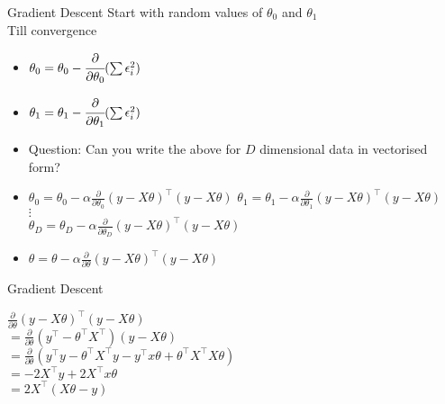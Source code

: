 \documentclass{beamer}
\begin{document}
\begin{frame}{Gradient Descent}
Start with random values of $\theta_{0}$ and $\theta_{1}$\\
Till convergence
\begin{itemize}[<+->]
	\item $\theta_{0} = \theta_{0} - \cfrac{\partial}{\partial \theta_{0}} (\sum \epsilon_{i}^{2}) $
	\item $\theta_{1} = \theta_{1} - \cfrac{\partial}{\partial \theta_{1}} (\sum \epsilon_{i}^{2}) $
	\item Question: Can you write the above for $D$ dimensional data in vectorised form?
	\item	\(\theta_{0}=\theta_{0}-\alpha \frac{\partial}{\partial \theta_{0}}\left(y-X\theta\right)^{\top}\left(y-X\theta\right)\)
	\(\theta_{1}=\theta_{1}-\alpha \frac{\partial}{\partial \theta_{1}}\left(y-X\theta\right)^{\top}\left(y-X\theta\right)\) 
	\\ $\vdots$
	\\	\(\theta_{D}=\theta_{D}-\alpha \frac{\partial}{\partial \theta_{D}}\left(y-X\theta\right)^{\top}\left(y-X\theta\right)\)
	\item \(\theta=\theta - \alpha \frac{\partial}{\partial \theta}\left(y-X\theta\right)^{\top}\left(y-X\theta\right)\) 

\end{itemize}
\end{frame}

\begin{frame}{Gradient Descent}


\(\frac{\partial}{\partial \theta}(y-X \theta)^{\top}(y-X \theta)\)
\\ \(=\frac{\partial}{\partial \theta}\left(y^{\top}-\theta^{\top} X^{\top}\right)(y-X \theta)\)
\\ \(=\frac{\partial}{\partial \theta}\left(y^{\top} y-\theta^{\top} X^{\top} y-y^{\top} x \theta+\theta^{\top} X^{\top} X \theta\right)\)
\\ \(=-2 X^{\top} y+2 X^{\top} x \theta\)
\\ \(=2 X^{\top}(X \theta-y)\)
	

\end{frame}
\end{document}

